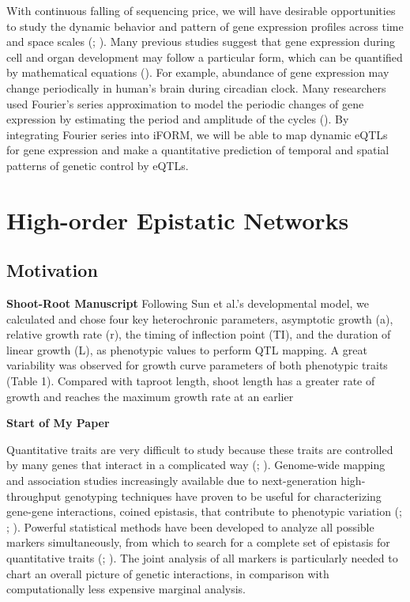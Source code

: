 \documentclass[11pt,]{book}
\theoremstyle{definition}
\theoremstyle{definition}
\theoremstyle{remark}
\begin{document}
With continuous falling of sequencing price, we will have desirable
opportunities to study the dynamic behavior and pattern of gene
expression profiles across time and space scales
(\cite{vinuela2010genome}; \cite{ackermann2013impact}). Many previous
studies suggest that gene expression during cell and organ development
may follow a particular form, which can be quantified by mathematical
equations (\cite{kim2010wavelet}). For example, abundance of gene
expression may change periodically in human's brain during circadian
clock. Many researchers used Fourier's series approximation to model the
periodic changes of gene expression by estimating the period and
amplitude of the cycles (\cite{li2013using}). By integrating Fourier
series into iFORM, we will be able to map dynamic eQTLs for gene
expression and make a quantitative prediction of temporal and spatial
patterns of genetic control by eQTLs.

\chapter{High-order Epistatic Networks}\label{highorder}

\section{Motivation}\label{motivation-1}

\textbf{Shoot-Root Manuscript} Following Sun et al.'s
\cite{sun2014model} developmental model, we calculated and chose four
key heterochronic parameters, asymptotic growth (a), relative growth
rate (r), the timing of inflection point (TI), and the duration of
linear growth (L), as phenotypic values to perform QTL mapping. A great
variability was observed for growth curve parameters of both phenotypic
traits (Table 1). Compared with taproot length, shoot length has a
greater rate of growth and reaches the maximum growth rate at an earlier

\textbf{Start of My Paper}

Quantitative traits are very difficult to study because these traits are
controlled by many genes that interact in a complicated way
(\cite{nelson2013century}; \cite{mackay2014epistasis}). Genome-wide
mapping and association studies increasingly available due to
next-generation high-throughput genotyping techniques have proven to be
useful for characterizing gene-gene interactions, coined epistasis, that
contribute to phenotypic variation (\cite{cordell2009detecting};
\cite{van2011travelling}; \cite{wei2014detecting}). Powerful statistical
methods have been developed to analyze all possible markers
simultaneously, from which to search for a complete set of epistasis for
quantitative traits (\cite{li2014fast}; \cite{gosik2016iform}). The
joint analysis of all markers is particularly needed to chart an overall
picture of genetic interactions, in comparison with computationally less
expensive marginal analysis.
\end{document}
